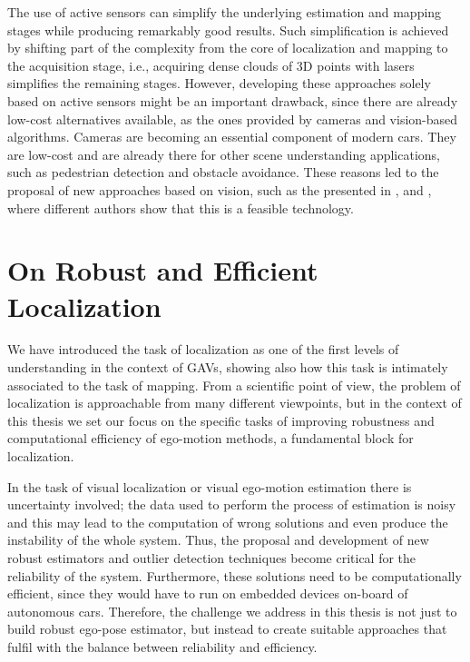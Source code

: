The use of active sensors can simplify the underlying estimation and mapping stages while producing remarkably good results. Such simplification is achieved by shifting part of the complexity from the core of localization and mapping to the acquisition stage, i.e., acquiring dense clouds of 3D points with lasers simplifies the remaining stages. However, developing these approaches solely based on active sensors might be an important drawback, since there are already low-cost alternatives available, as the ones provided by cameras and vision-based algorithms. Cameras are becoming an essential component of modern cars. They are low-cost and are already there for other scene understanding applications, such as pedestrian detection and obstacle avoidance. These reasons led to the proposal of new approaches based on vision, such as the presented in \cite{VastScale}, \cite{RSLAM} and \cite{VisualOdometryStereo}, where different authors show that this is a feasible technology.

\section{On Robust and Efficient Localization}

We have introduced the task of localization as one of the first levels of understanding in the context of GAVs, showing also how this task is intimately associated to the task of mapping. From a scientific point of view, the problem of localization is approachable from many different viewpoints, but in the context of this thesis we set our focus on the specific tasks of improving robustness and computational efficiency of ego-motion methods, a fundamental block for localization.

In the task of visual localization or visual ego-motion estimation there is uncertainty involved; the data used to perform the process of estimation is noisy and this may lead to the computation of wrong solutions and even produce the instability of the whole system. Thus, the proposal and development of new robust estimators and outlier detection techniques become critical for the reliability of the system. Furthermore, these solutions need to be computationally efficient, since they would have to run on embedded devices on-board of autonomous cars. Therefore, the challenge we address in this thesis is not just to build robust ego-pose estimator, but instead to create suitable approaches that fulfil with the balance between reliability and efficiency.

